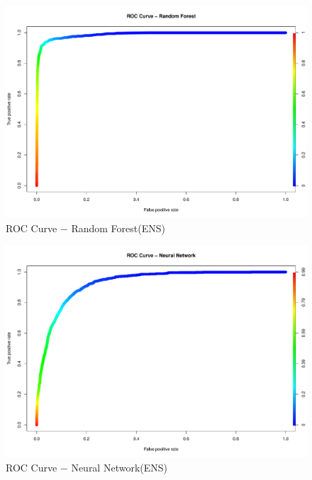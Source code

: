 \documentclass[12pt, a4paper, bibliography=totoc, english]{scrartcl}
\begin{document}
\begin{figure}
	\centering
	\includegraphics[width=0.7\linewidth]{ENS1}
	\caption{ROC Curve − Random Forest(ENS)}
	\label{fig:ens1}
\end{figure}
\begin{figure}
	\centering
	\includegraphics[width=0.7\linewidth]{ENS2}
	\caption{ROC Curve − Neural Network(ENS)}
	\label{fig:ens2}
\end{figure}
\end{document}
